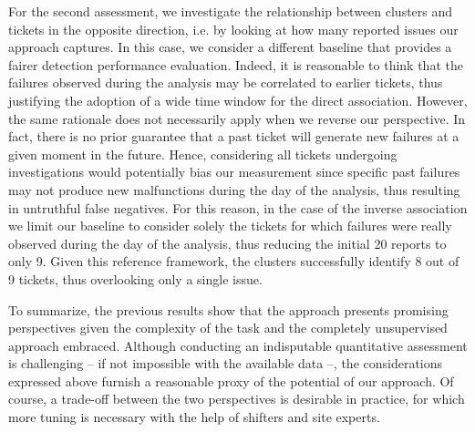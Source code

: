 For the second assessment, we investigate the relationship between clusters and tickets in the opposite direction, i.e. by looking at how many reported issues our approach captures.
In this case, we consider a different baseline that provides a fairer detection performance evaluation.
Indeed, it is reasonable to think that the failures observed during the analysis may be correlated to earlier tickets, thus justifying the adoption of a wide time window for the direct association.
However, the same rationale does not necessarily apply when we reverse our perspective. In fact, there is no prior guarantee that a past ticket will generate new failures at a given moment in the future.
Hence, considering all tickets undergoing investigations would potentially bias our measurement since specific past failures may not produce new malfunctions during the day of the analysis, thus resulting in untruthful false negatives.
For this reason, in the case of the inverse association we limit our baseline to consider solely the tickets for which failures were really observed during the day of the analysis, thus reducing the initial 20 reports to only 9.
Given this reference framework, the clusters successfully identify 8 out of 9 tickets, thus overlooking only a single issue. 

To summarize, the previous results show that the approach presents promising perspectives given the complexity of the task and the completely unsupervised approach embraced.
Although conducting an indisputable quantitative assessment is challenging -- if not impossible with the available data --, the considerations expressed above furnish a reasonable proxy of the potential of our approach.
Of course, a trade-off between the two perspectives is desirable in practice, for which more tuning is necessary with the help of shifters and site experts. 